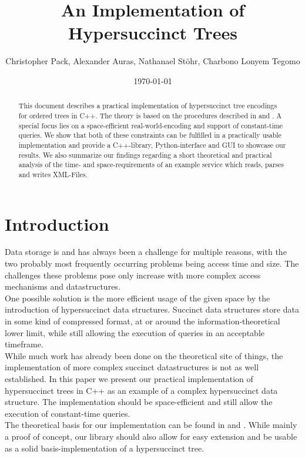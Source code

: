 \documentclass{article}
\begin{document}
\title{An Implementation of Hypersuccinct Trees}
\author{Christopher Pack, Alexander Auras, Nathanael Stöhr, Charbono Lonyem Tegomo}
\date{\today}
\maketitle


\begin{abstract}
This document describes a practical implementation of hypersuccinct tree encodings for ordered trees in C++. The theory is based on the procedures described in \cite{farzanMunro} and \cite{universalSuccinct}. A special focus lies on a space-efficient real-world-encoding and support of constant-time queries. We show that both of these constraints can be fulfilled in a practically usable implementation and provide a C++-library, Python-interface and GUI to showcase our results. We also summarize our findings regarding a short theoretical and practical analysis of the time- and space-requirements of an example service which reads, parses and writes XML-Files.

\end{abstract}

\tableofcontents

\section{Introduction} \label{Introduction}
Data storage is and has always been a challenge for multiple reasons, with the two probably most frequently occurring problems being access time and size. The challenges these problems pose only increase with more complex access mechanisms and datastructures.\\
One possible solution is the more efficient usage of the given space by the introduction of hypersuccinct data structures. Succinct data structures store data in some kind of compressed format, at or around the information-theoretical lower limit, while still allowing the execution of queries in an acceptable timeframe.\\
While much work has already been done on the theoretical site of things, the implementation of more complex succinct datastructures is not as well established. In this paper we present our practical implementation of hypersuccinct trees in C++ as an example of a complex hypersuccinct data structure. The implementation should be space-efficient and still allow the execution of constant-time queries.\\
The theoretical basis for our implementation can be found in \cite{farzanMunro} and \cite{universalSuccinct}. While mainly a proof of concept, our library should also allow for easy extension and be usable as a solid basis-implementation of a hypersuccinct tree.
\end{document}

